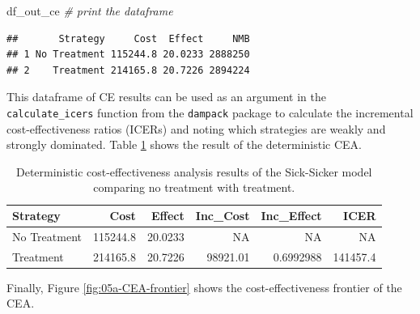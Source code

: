 \documentclass[]{book}
\newenvironment{Shaded}{\begin{snugshade}}{\end{snugshade}}
\newcommand{\CommentTok}[1]{\textcolor[rgb]{0.56,0.35,0.01}{\textit{#1}}}
\newcommand{\DataTypeTok}[1]{\textcolor[rgb]{0.13,0.29,0.53}{#1}}
\newcommand{\KeywordTok}[1]{\textcolor[rgb]{0.13,0.29,0.53}{\textbf{#1}}}
\newcommand{\NormalTok}[1]{#1}
\newcommand{\OperatorTok}[1]{\textcolor[rgb]{0.81,0.36,0.00}{\textbf{#1}}}
\newcommand{\StringTok}[1]{\textcolor[rgb]{0.31,0.60,0.02}{#1}}
\begin{document}
\begin{Shaded}
\begin{Highlighting}[]
\NormalTok{df_out_ce }\CommentTok{# print the dataframe }
\end{Highlighting}
\end{Shaded}

\begin{verbatim}
##       Strategy     Cost  Effect     NMB
## 1 No Treatment 115244.8 20.0233 2888250
## 2    Treatment 214165.8 20.7226 2894224
\end{verbatim}

This dataframe of CE results can be used as an argument in the \texttt{calculate\_icers} function from the \texttt{dampack} package to calculate the incremental cost-effectiveness ratios (ICERs) and noting which strategies are weakly and strongly dominated. Table \ref{tab:df-cea-det} shows the result of the deterministic CEA.

\begin{Shaded}
\end{Shaded}

\begin{table}[t]

\caption{\label{tab:df-cea-det}Deterministic cost-effectiveness analysis results of the Sick-Sicker model comparing no treatment with treatment.}
\centering
\begin{tabular}{l|r|r|r|r|r}
\hline
Strategy & Cost & Effect & Inc\_Cost & Inc\_Effect & ICER\\
\hline
No Treatment & 115244.8 & 20.0233 & NA & NA & NA\\
\hline
Treatment & 214165.8 & 20.7226 & 98921.01 & 0.6992988 & 141457.4\\
\hline
\end{tabular}
\end{table}

Finally, Figure \ref{fig:05a-CEA-frontier} shows the cost-effectiveness frontier of the CEA.
\end{document}
